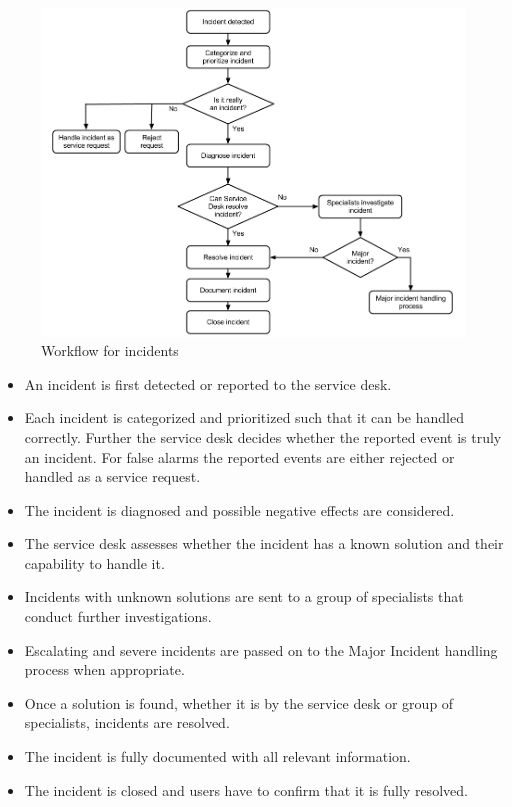 \begin{figure}[H]
\hspace{-1.1cm}\includegraphics[scale=0.49]{workflowcaseC.png}
\caption[Workflow for incidents, Case B]{Workflow for incidents}
\label{fig:workflowcaseC}
\end{figure}

\begin{itemize}
\item An incident is first detected or reported to the service desk.
\item Each incident is categorized and prioritized such that it can be handled correctly. Further the service desk decides whether the reported event is truly an incident. For false alarms the reported events are either rejected or handled as a service request.
\item The incident is diagnosed and possible negative effects are considered.
\item The service desk assesses whether the incident has a known solution and their capability to handle it.
\item Incidents with unknown solutions are sent to a group of specialists that conduct further investigations.
\item Escalating and severe incidents are passed on to the Major Incident handling process when appropriate. 
\item Once a solution is found, whether it is by the service desk or group of specialists, incidents are resolved.
\item The incident is fully documented with all relevant information.
\item The incident is closed and users have to confirm that it is fully resolved. 
\end{itemize}

